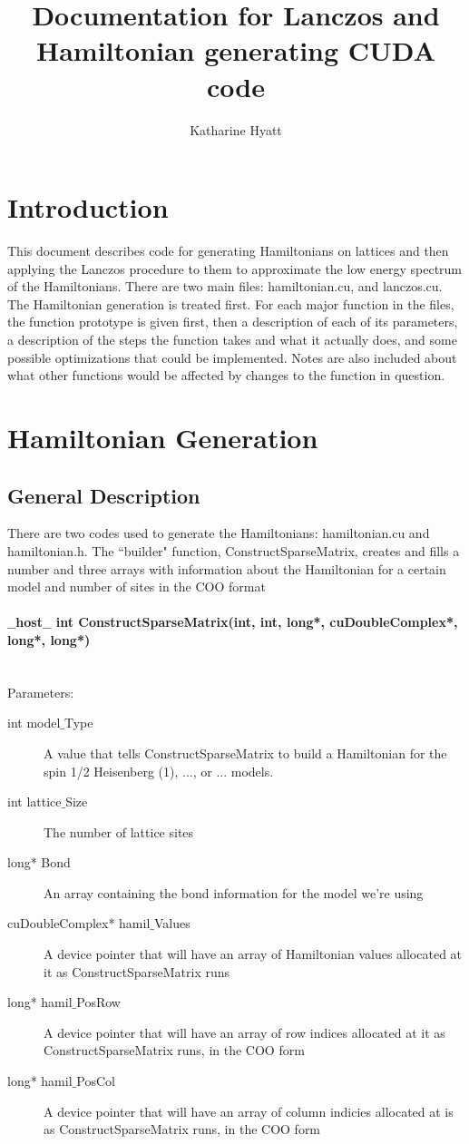\documentclass{article}
\author{Katharine Hyatt}
\title{Documentation for Lanczos and Hamiltonian generating CUDA code}
\begin{document}
\maketitle

\section{Introduction}

This document describes code for generating Hamiltonians on lattices and then applying the Lanczos procedure to them to approximate the low energy spectrum of the Hamiltonians. There are two main files: hamiltonian.cu, and lanczos.cu. The Hamiltonian generation is treated first. For each major function in the files, the function prototype is given first, then a description of each of its parameters, a description of the steps the function takes and what it actually does, and some possible optimizations that could be implemented. Notes are also included about what other functions would be affected by changes to the function in question.

\section{Hamiltonian Generation}

\subsection{General Description}

There are two codes used to generate the Hamiltonians: hamiltonian.cu and hamiltonian.h. The ``builder" function, ConstructSparseMatrix, creates and fills a number and three arrays with information about the Hamiltonian for a certain model and number of sites in the COO format

\paragraph{$\_\_$host$\_\_$ int ConstructSparseMatrix(int, int, long*, cuDoubleComplex*, long*, long*)}
\\
Parameters:
\begin{description}
\item[int model$\_$Type] A value that tells ConstructSparseMatrix to build a Hamiltonian for the spin 1/2 Heisenberg (1), ..., or ... models.
\item[int lattice$\_$Size] The number of lattice sites
\item[long* Bond] An array containing the bond information for the model we're using 
\item[cuDoubleComplex* hamil$\_$Values] A device pointer that will have an array of Hamiltonian values allocated at it as ConstructSparseMatrix runs
\item[long* hamil$\_$PosRow] A device pointer that will have an array of row indices allocated at it as ConstructSparseMatrix runs, in the COO form
\item[long* hamil$\_$PosCol] A device pointer that will have an array of column indicies allocated at is as ConstructSparseMatrix runs, in the COO form
\end{description}
\end{document}
